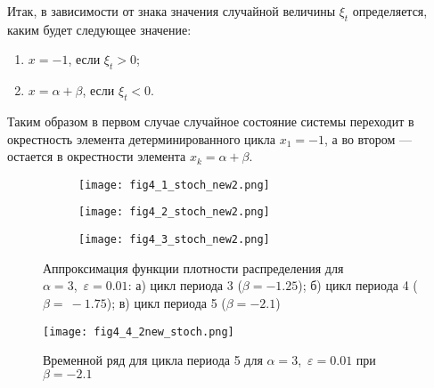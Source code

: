 \documentclass[a4paper, 14pt]{extreport}
\numberwithin{equation}{section}
\numberwithin{figure}{section}
\numberwithin{table}{section}
\begin{document}
                Итак, в зависимости от знака значения случайной величины $ \xi_{t} $ определяется, каким будет следующее значение:
				\begin{enumerate}
					\item $ x = -1 $, если $ \xi_{t} > 0 $;
                    \item $ x = \alpha + \beta $, если $ \xi_{t} < 0 $.
				\end{enumerate} %

                Таким образом в первом случае случайное состояние системы переходит в окрестность элемента детерминированного цикла $ x_{1} = -1 $, а во втором --- остается в окрестности элемента $ x_{k} = \alpha + \beta $.


				\begin{figure}[p] %
				\centering
                	\begin{subfigure}[l]{0.75\textwidth}
                    \centering
                    	\texttt{[image: fig4\_1\_stoch\_new2.png]}
                        \caption{}
                	\end{subfigure}

                    \begin{subfigure}[l]{0.75\textwidth}
                    \centering
                    	\texttt{[image: fig4\_2\_stoch\_new2.png]}
                        \caption{}
                    \end{subfigure}

                    \begin{subfigure}[l]{0.75\textwidth}
                    \centering
                    	\texttt{[image: fig4\_3\_stoch\_new2.png]}%
                        \caption{}
                    \end{subfigure}
                    \caption{Аппроксимация функции плотности распределения для \\$ \alpha = 3 $,~$ \varepsilon = 0.01 $: а) цикл периода 3 ($ \beta = -1.25 $); б) цикл периода 4 ($ \beta =~-1.75 $); в) цикл периода 5 ($ \beta = -2.1 $)}
                    \label{fig4_stoch}
				\end{figure}

			    \begin{figure}[h!]
					\begin{center}
						\texttt{[image: fig4\_4\_2new\_stoch.png]}
					\end{center}
					\caption{Временной ряд для цикла периода 5 для $ \alpha = 3 $,~$ \varepsilon = 0.01 $ при $ \beta = -2.1 $}
					\label{fig4_4_stoch}		
				\end{figure}
\end{document}
